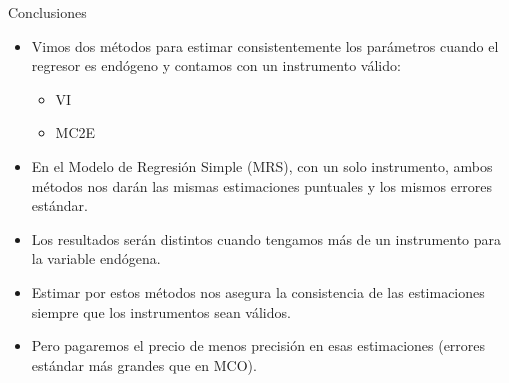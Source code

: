 \documentclass[10pt]{beamer}
\begin{document}
    

\begin{frame}{Conclusiones}

\begin{itemize}
    \item Vimos dos métodos para estimar consistentemente los parámetros cuando el regresor es endógeno y contamos con un instrumento válido:
    \begin{itemize}
        \item VI
        \item MC2E
    \end{itemize}
    
    \item En el Modelo de Regresión Simple (MRS), con un solo instrumento, ambos métodos nos darán las mismas estimaciones puntuales y los mismos errores estándar.
    
    \item Los resultados serán distintos cuando tengamos más de un instrumento para la variable endógena.
    
    \item Estimar por estos métodos nos asegura la consistencia   de las estimaciones siempre que los instrumentos sean válidos.
    
    \item Pero pagaremos el precio de menos precisión en esas estimaciones (errores estándar más grandes que en MCO).
    
   
\end{itemize}

\end{frame}
\end{document}
